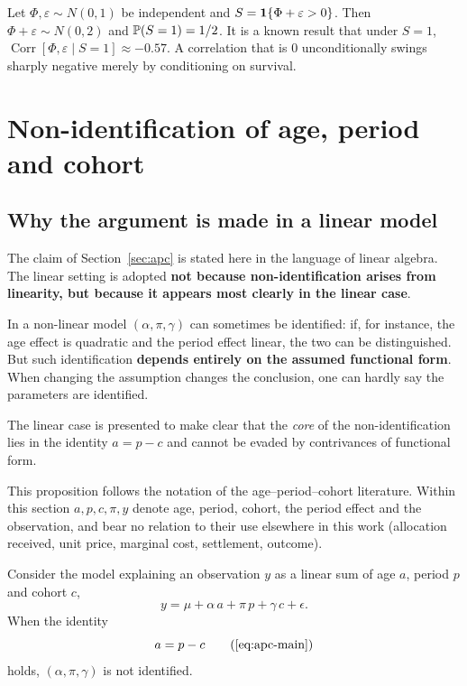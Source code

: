 \begin{example}
Let $\Phi,\varepsilon\sim N(0,1)$ be independent and $S=\mathbf{1}\{\Phi+\varepsilon>0\}$. Then
$\Phi+\varepsilon\sim N(0,2)$ and $\mathbb{P}(S=1)=1/2$. It is a known result that under $S=1$,
$\operatorname{Corr}[\Phi,\varepsilon\mid S=1] \approx -0.57$. A correlation that is $0$
unconditionally swings sharply negative merely by conditioning on survival.
\end{example}

\section{Non-identification of age, period and cohort}

\subsection{Why the argument is made in a linear model}

The claim of Section~\ref{sec:apc} is stated here in the language of linear algebra. The linear
setting is adopted \textbf{not because non-identification arises from linearity, but because it
appears most clearly in the linear case}.

In a non-linear model $(\alpha,\pi,\gamma)$ can sometimes be identified: if, for instance, the age
effect is quadratic and the period effect linear, the two can be distinguished. But such
identification \textbf{depends entirely on the assumed functional form}. When changing the
assumption changes the conclusion, one can hardly say the parameters are identified.

The linear case is presented to make clear that the \emph{core} of the non-identification lies in
the identity $a=p-c$ and cannot be evaded by contrivances of functional form.

\begin{proposition}
\label{prop:apc}
This proposition follows the notation of the age--period--cohort literature. Within this section
$a,p,c,\pi,y$ denote age, period, cohort, the period effect and the observation, and bear no
relation to their use elsewhere in this work (allocation received, unit price, marginal cost,
settlement, outcome).

Consider the model explaining an observation $y$ as a linear sum of age $a$, period $p$ and
cohort $c$,
\[
y = \mu + \alpha\,a + \pi\,p + \gamma\,c + \epsilon .
\]
When the identity
\begin{equation}
a = p - c \tag{\ref{eq:apc-main}}
\end{equation}
holds, $(\alpha,\pi,\gamma)$ is not identified.
\end{proposition}

